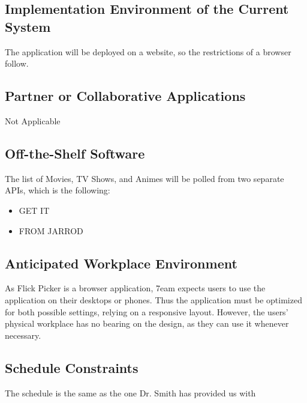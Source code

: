 \documentclass[12pt]{article}
\begin{document}
\subsection{Implementation Environment of the Current System}
The application will be deployed on a website, so the restrictions of a browser follow.

\subsection{Partner or Collaborative Applications}
Not Applicable

\subsection{Off-the-Shelf Software}
The list of Movies, TV Shows, and Animes will be polled from two separate APIs, which is the following:
\begin{itemize}
	\item GET IT
	\item FROM JARROD
\end{itemize}

\subsection{Anticipated Workplace Environment}
As Flick Picker is a browser application, 7eam expects users to use the application on their desktops or phones. Thus the application must be optimized for both possible settings, relying on a responsive layout. However, the users' physical workplace has no bearing on the design, as they can use it whenever necessary. 

\subsection{Schedule Constraints}
The schedule is the same as the one Dr. Smith has provided us with
\end{document}
